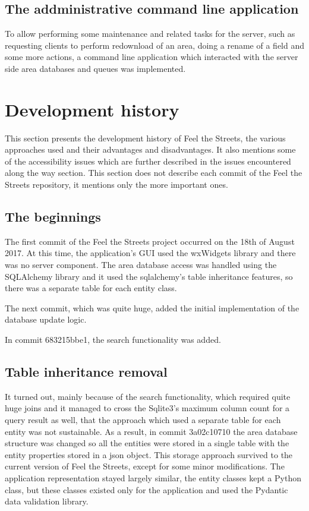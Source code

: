 \documentclass[nolof,digital]{fithesis3}
\begin{document}
\subsection{The addministrative command line application}
To allow performing some maintenance and related tasks for the server, such as requesting clients to perform redownload of an area, doing a rename of a field and some more actions, a command line application which interacted with the server side area databases and queues was implemented.
\section{Development history}
This section presents the development history of Feel the Streets, the various approaches used and their advantages and disadvantages. It also mentions some of the accessibility issues which are further described in the issues encountered along the way section. This section does not describe each commit of the Feel the Streets repository, it mentions only the more important ones.
\subsection{The beginnings}
The first commit of the Feel the Streets project occurred on the 18th of August 2017. At this time, the application's GUI used the wxWidgets library \parencite{wx} and there was no server component. The area database access was handled using the SQLAlchemy library and it used the sqlalchemy's table inheritance features, so there was a separate table for each entity class.

The next commit, which was quite huge, added the initial implementation of the database update logic.

In commit 683215bbe1, the search functionality was added.
\subsection{Table inheritance removal}
It turned out, mainly because of the search functionality, which required quite huge joins and it managed to cross the Sqlite3's maximum column count for a query result as well, that the approach which used a separate table for each entity was not sustainable. As a result, in commit 3a02c10710 the area database structure was changed so all the entities were stored in a single table with the entity properties stored in a json object. This storage approach survived to the current version of Feel the Streets, except for some minor modifications. The application representation stayed largely similar, the entity classes kept a Python class, but these classes existed only for the application and used the Pydantic data validation library.
\end{document}
